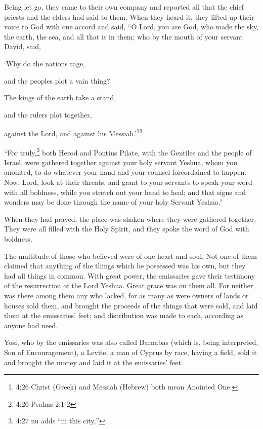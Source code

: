 \myverse{}Being let go, they came to their own company and reported all
that the chief priests and the elders had said to them.
\myverse{}When they heard it, they lifted up their voice to God with one accord and
said, “O Lord, you are God, who made the sky, the earth, the sea, and all that is in them;
\myverse{}who by the mouth of your servant David, said,

‘Why do the nations rage,

and the peoples plot a vain thing?

\myverse{}The kings of the earth take a stand,

and the rulers plot together,

against the Lord, and against his Messiah.’\footnote{4:26 Christ (Greek) and Messiah (Hebrew) both mean Anointed One.}\footnote{4:26 Psalms 2:1-2}

\myverse{}“For truly,\footnote{4:27 nu adds “in this city,”} both Herod and Pontius Pilate, with the Gentiles and the people
of Israel, were gathered together against your holy servant Yeshua, whom you anointed,
\myverse{}to do whatever your hand and your counsel foreordained to happen.
\myverse{}Now, Lord, look at their threats, and grant to your servants to speak your
word with all boldness,
\myverse{}while you stretch out your hand to heal; and that signs and wonders may be
done through the name of your holy Servant Yeshua.”

\myverse{}When they had prayed, the place was shaken where they were gathered
together. They were all filled with the Holy Spirit, and they spoke the word of God with boldness.

\myverse{}The multitude of those who believed were of one heart and soul.
Not one of them claimed that anything of the things which he possessed was his own, but they had all things
in common.
\myverse{}With great power, the emissaries gave their testimony of the resurrection
of the Lord Yeshua. Great grace was on them all.
\myverse{}For neither was there among them any who lacked, for as many as were owners
of lands or houses sold them, and brought the proceeds of the things that were sold,
\myverse{}and laid them at the emissaries’ feet; and distribution was made to each,
according as anyone had need.

\myverse{}Yosi, who by the emissaries was also called Barnabas (which is,
being interpreted, Son of Encouragement), a Levite, a man of Cyprus by race,
\myverse{}having a field, sold it and brought the money and laid it at the emissaries’
feet.



